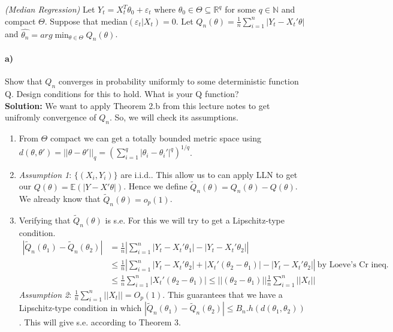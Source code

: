 \documentclass[11pt,letterpaper]{article}                  %
\begin{document}
\bigskip
\begin{problem}
\textit{(Median Regression)} Let $Y_t = X_t^T\theta_0 + \varepsilon_t$ where $\theta_0 \in \Theta \subseteq \mathbb{R}^q$ for some $q \in \mathbb{N}$ and compact $\Theta$. Suppose that median$(\varepsilon_t|X_t)=0$. Let $Q_n(\theta) = \frac{1}{n}\sum_{i=1}^n |Y_t - X_t'\theta|$ and $\widehat{\theta_n} = arg\min_{\theta \in \Theta} Q_n(\theta)$.
\paragraph*{a)} Show that $Q_n$ converges in probability uniformly to some deterministic function Q. Design conditions for this to hold. What is your Q function? \\

\textbf{Solution:} We want to apply Theorem 2.b from this lecture notes to get unifromly convergence of $Q_n$. So, we will check its assumptions.
\begin{enumerate}
\item From $\Theta$ compact we can get a totally bounded metric space using $d(\theta,\theta')=||\theta-\theta'||_q = \left(\sum_{i=1}^q |\theta_i-\theta_i'|^q\right)^{1/q}$. 
\item \textit{Assumption 1}: $\{(X_i,Y_i)\}$ are i.i.d.. This allow us to can apply LLN to get our $Q(\theta)=\mathbb{E}(|Y-X'\theta|)$. Hence we define $\tilde{Q}_n(\theta) = Q_n(\theta)-Q(\theta)$. We already know that $\tilde{Q}_n(\theta) = o_p(1)$.
\item Verifying that $\tilde{Q}_n(\theta)$ is s.e. For this we will try to get a Lipschitz-type condition.
\begin{align*}
|\tilde{Q}_n(\theta_1)-\tilde{Q}_n(\theta_2)| &=\frac{1}{n} \left| \sum_{i=1}^n |Y_t - X_t'\theta_1| - |Y_t - X_t'\theta_2|\right|\\
&\leq \frac{1}{n} \left| \sum_{i=1}^n |Y_t - X_t'\theta_2| +|X_t'(\theta_2-\theta_1)| - |Y_t - X_t'\theta_2|\right| \ \text{by Loeve's Cr ineq.}\\
&\leq \frac{1}{n} \sum_{i=1}^n |X_t'(\theta_2-\theta_1)| \leq ||(\theta_2-\theta_1)|| \frac{1}{n} \sum_{i=1}^n ||X_t||
\end{align*}
\textit{Assumption 2}: $\frac{1}{n} \sum_{i=1}^n ||X_t|| = O_p(1)$. This guarantees that we have a Lipschitz-type condition in which $|\tilde{Q}_n(\theta_1)-\tilde{Q}_n(\theta_2)| \leq B_n . h(d(\theta_1,\theta_2))$. This will give s.e. according to Theorem 3.
\end{enumerate}


\end{problem}
\end{document}
